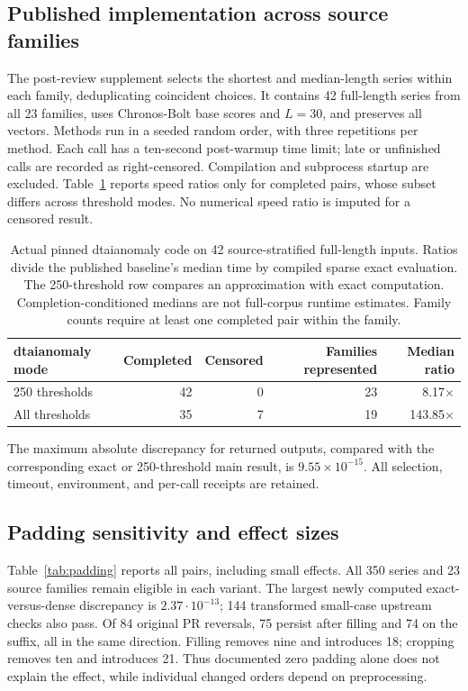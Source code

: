 \subsection{Published implementation across source families}
The post-review supplement selects the shortest and median-length series
within each family, deduplicating coincident choices. It contains
42 full-length series from all 23
families, uses Chronos-Bolt base scores and $L=30$, and preserves all vectors.
Methods run in a seeded random order, with three repetitions per method.
Each call has a ten-second post-warmup time limit; late or unfinished calls
are recorded as right-censored. Compilation and subprocess startup are
excluded. Table~\ref{tab:external} reports speed ratios only for completed
pairs, whose subset differs across threshold modes. No numerical speed ratio
is imputed for a censored result.

\begin{table}[t]
\centering
\begin{tabular}{lrrrr}
\toprule
dtaianomaly mode & Completed & Censored & Families represented & Median ratio \\
\midrule
250 thresholds & 42 & 0 & 23 & 8.17$\times$ \\
All thresholds & 35 & 7 & 19 & 143.85$\times$ \\
\bottomrule
\end{tabular}
\caption{Actual pinned dtaianomaly code on 42 source-stratified
full-length inputs. Ratios divide the published baseline's median time by
compiled sparse exact evaluation. The 250-threshold row compares an
approximation with exact computation. Completion-conditioned medians are
not full-corpus runtime estimates. Family counts require at least one completed
pair within the family.}
\label{tab:external}
\end{table}

The maximum absolute discrepancy for returned outputs, compared with the
corresponding exact or 250-threshold main result, is
$9.55\times10^{-15}$. All selection, timeout, environment,
and per-call receipts are retained.


\subsection{Padding sensitivity and effect sizes}
Table~\ref{tab:padding} reports all pairs, including small effects.
All 350 series and 23 source families remain eligible in each variant.
The largest newly computed exact-versus-dense discrepancy is
$2.37\cdot10^{-13}$; 144 transformed small-case upstream checks also pass.
Of 84 original PR reversals, 75 persist after filling and 74 on the suffix,
all in the same direction. Filling removes nine and introduces 18; cropping
removes ten and introduces 21. Thus documented zero padding alone does not
explain the effect, while individual changed orders depend on preprocessing.

